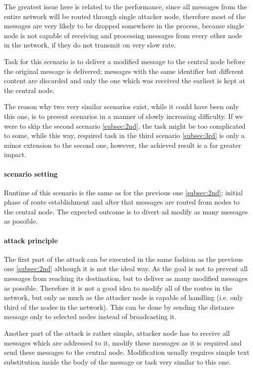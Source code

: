 \documentclass[
  print, %
  table,   %
  nolof,     %
  nolot,     %
           oneside
]{fithesis3}
\begin{document}
    The greatest issue here is related to the performance, since all messages from the entire network will be routed through single attacker node, therefore most of the messages are very likely to be dropped somewhere in the process, because single node is not capable of receiving and processing messages from every other node in the network, if they do not transmit on very slow rate.

    Task for this scenario is to deliver a modified message to the central node before the original message is delivered; messages with the same identifier but different content are discarded and only the one which was received the earliest is kept at the central node.

    The reason why two very similar scenarios exist, while it could have been only this one, is to present scenarios in a manner of slowly increasing difficulty. If we were to skip the second scenario \ref{subsec:2nd}, the task might be too complicated to some, while this way, required task in the third scenario \ref{subsec:3rd} is only a minor extension to the second one, however, the achieved result is a far greater impact.

    \paragraph{scenario setting}
    Runtime of this scenario is the same as for the previous one \ref{subsec:2nd}; initial phase of route establishment and after that messages are routed from nodes to the central node. The expected outcome is to divert ad modify as many messages as possible.

    \paragraph{attack principle}
    The first part of the attack can be executed in the same fashion as the previous one \ref{subsec:2nd} although it is not the ideal way. As the goal is not to prevent all messages from reaching its destination, but to deliver as many modified messages as possible. Therefore it is not a good idea to modify all of the routes in the network, but only as much as the attacker node is capable of handling (i.e. only third of the nodes in the network). This can be done by sending the distance message only to selected nodes instead of broadcasting it.

    Another part of the attack is rather simple, attacker node has to receive all messages which are addressed to it, modify these messages as it is required and send these messages to the central node. Modification usually requires simple text substitution inside the body of the message or task very similar to this one.
\end{document}
